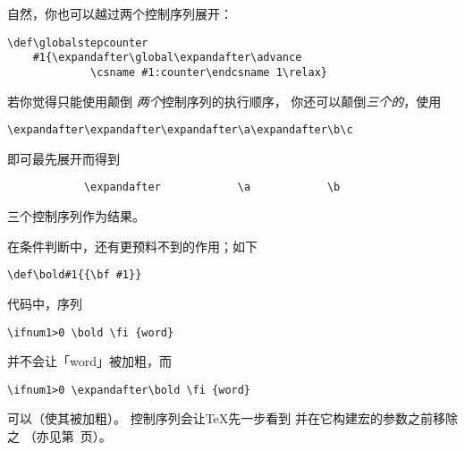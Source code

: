 \documentclass{book}
\begin{document}
自然，你也可以越过两个控制序列展开：
\begin{verbatim}
\def\globalstepcounter
    #1{\expandafter\global\expandafter\advance
             \csname #1:counter\endcsname 1\relax}
\end{verbatim}
若你觉得只能使用颠倒
{\sl 两个\/}控制序列的执行顺序，
你还可以颠倒{\sl 三个的\/}，使用
\begin{verbatim}
\expandafter\expandafter\expandafter\a\expandafter\b\c 
\end{verbatim}
即可最先展开而得到
\begin{verbatim}
            \expandafter            \a            \b 
\end{verbatim} 
三个控制序列作为结果。

在条件判断中，还有更预料不到的作用；如下
\begin{verbatim}
\def\bold#1{{\bf #1}}
\end{verbatim}
代码中，序列
\begin{verbatim}
\ifnum1>0 \bold \fi {word}
\end{verbatim}
并不会让「word」被加粗，而
\begin{verbatim}
\ifnum1>0 \expandafter\bold \fi {word}
\end{verbatim}
可以（使其被加粗）。
控制序列会让{\TeX}先一步看到
并在它构建宏的参数之前移除之
（亦见第~\pageref{after:cond}页）。
\end{document}
